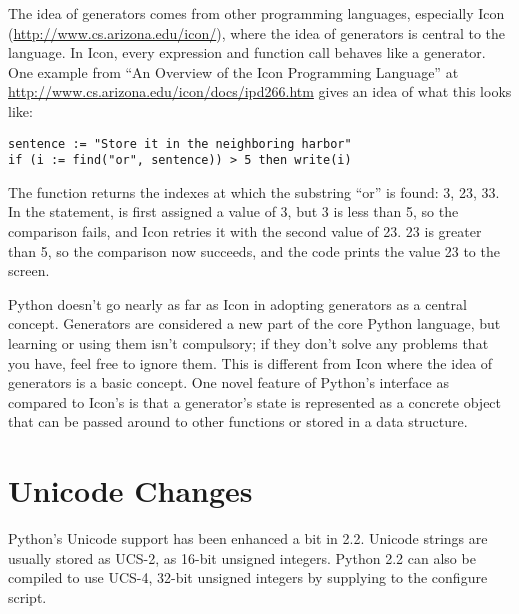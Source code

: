 \documentclass{howto}
\begin{document}
The idea of generators comes from other programming languages,
especially Icon (\url{http://www.cs.arizona.edu/icon/}), where the
idea of generators is central to the language.  In Icon, every
expression and function call behaves like a generator.  One example
from ``An Overview of the Icon Programming Language'' at
\url{http://www.cs.arizona.edu/icon/docs/ipd266.htm} gives an idea of
what this looks like:

\begin{verbatim}
sentence := "Store it in the neighboring harbor"
if (i := find("or", sentence)) > 5 then write(i)
\end{verbatim}

The  function returns the indexes at which the
substring ``or'' is found: 3, 23, 33.  In the  statement,
 is first assigned a value of 3, but 3 is less than 5, so the
comparison fails, and Icon retries it with the second value of 23.  23
is greater than 5, so the comparison now succeeds, and the code prints
the value 23 to the screen.

Python doesn't go nearly as far as Icon in adopting generators as a
central concept.  Generators are considered a new part of the core
Python language, but learning or using them isn't compulsory; if they
don't solve any problems that you have, feel free to ignore them.
This is different from Icon where the idea of generators is a basic
concept.  One novel feature of Python's interface as compared to
Icon's is that a generator's state is represented as a concrete object
that can be passed around to other functions or stored in a data
structure.

\begin{seealso}


\end{seealso}

\section{Unicode Changes}

Python's Unicode support has been enhanced a bit in 2.2.  Unicode
strings are usually stored as UCS-2, as 16-bit unsigned integers.
Python 2.2 can also be compiled to use UCS-4, 32-bit unsigned integers
by supplying  to the configure script.
\end{document}
